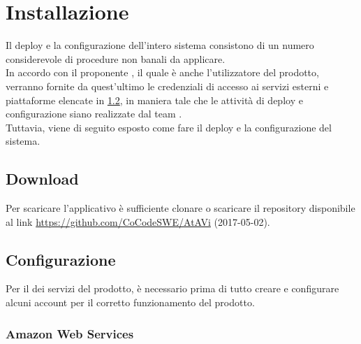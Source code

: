 \section{Installazione}
Il deploy e la configurazione dell'intero sistema consistono di un numero considerevole di procedure non banali da applicare.\\
In accordo con il proponente \PROPONENTE, il quale è anche l'utilizzatore del prodotto, verranno fornite da quest'ultimo le credenziali di accesso ai servizi esterni e piattaforme elencate in \ref{configurazione}, in maniera tale che le attività di deploy e configurazione siano realizzate dal team \GRUPPO.\\
Tuttavia, viene di seguito esposto come fare il deploy e la configurazione del sistema.
\subsection{Download}\label{download}
Per scaricare l'applicativo è sufficiente clonare o scaricare il repository disponibile al link \url{https://github.com/CoCodeSWE/AtAVi} (2017-05-02).

\subsection{Configurazione}\label{configurazione}
Per il  dei servizi del prodotto, è necessario prima di tutto creare e configurare alcuni account per il corretto funzionamento del prodotto.

\subsubsection{Amazon Web Services}
